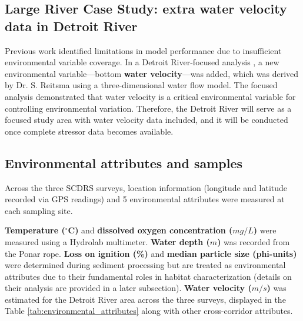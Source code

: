 \subsection{Large River Case Study: extra water velocity data in Detroit River}
Previous work \cite{Zhang2008} identified limitations in model performance due to insufficient environmental variable coverage.
In a Detroit River-focused analysis \cite{Zhang2008},
a new environmental variable—bottom \textbf{water velocity}—was added,
which was derived by Dr. S. Reitsma using a three-dimensional water flow model.
The focused analysis demonstrated that water velocity is a critical environmental variable for
controlling environmental variation.
Therefore, the Detroit River will serve as a focused study area with water velocity data included,
and it will be conducted once complete stressor data becomes available.

\subsection{Environmental attributes and samples}

Across the three SCDRS surveys, 
location information (longitude and latitude recorded via GPS readings) and 5 environmental attributes
were measured at each sampling site.

\textbf{Temperature ($^\circ$C)} and \textbf{dissolved oxygen concentration ($mg/L$)} were measured using a Hydrolab multimeter. 
\textbf{Water depth ($m$)} was recorded from the Ponar rope.
\textbf{Loss on ignition (\%)} and \textbf{median particle size (phi-units)} were determined during sediment 
processing but are treated as environmental attributes due to their fundamental roles in habitat
characterization (details on their analysis are provided in a later subsection).
\textbf{Water velocity ($m/s$)} was estimated for the Detroit River area across the three surveys,
displayed in the Table \textcolor{blue}{\ref{tab:environmental_attributes}} along with other cross-corridor attributes.



